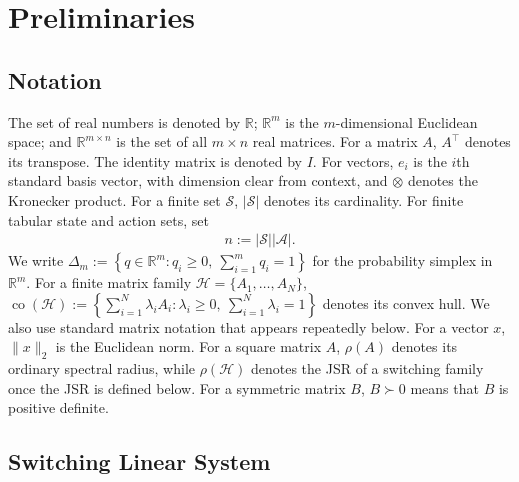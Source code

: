 \documentclass[letterpaper]{article}
\numberwithin{equation}{section}
\newcommand{\R}{\mathbb{R}}
\newcommand{\co}{\operatorname{co}}
\begin{document}
\section{Preliminaries}
\label{sec:preliminaries}
\subsection{Notation}
\label{sec:notation}

The set of real numbers is denoted by $\R$; $\R^m$ is the $m$-dimensional
Euclidean space; and $\R^{m\times n}$ is the set of all $m\times n$ real
matrices. For a matrix $A$, $A^\top$ denotes its transpose. The identity
matrix is denoted by $I$. For vectors, $e_i$ is the $i$th standard basis vector,
with dimension clear from context, and $\otimes$ denotes the Kronecker product.
For a finite set $\mathcal S$, $|\mathcal S|$ denotes its cardinality. For finite tabular state and action sets, set
\begin{align*}
  n:=|\mathcal S||\mathcal A|.
\end{align*}
We write $\Delta_m:=\left\{q\in\R^m:q_i\geq0,\ \sum_{i=1}^m q_i=1\right\}$ for the probability simplex in $\R^m$. For a finite matrix family
$\mathcal H=\{A_1,\ldots,A_N\}$, $\co(\mathcal H)
:=\left\{\sum_{i=1}^N\lambda_i A_i:
\lambda_i\geq0,\ \sum_{i=1}^N\lambda_i=1\right\}$ denotes its convex hull.
We also use standard matrix notation that appears repeatedly below. For a
vector $x$, $\|x\|_2$ is the Euclidean norm. For a square matrix $A$,
$\rho(A)$ denotes its ordinary spectral radius, while $\rho(\mathcal H)$ denotes
the JSR of a switching family once the JSR is defined below. For a symmetric
matrix $B$, $B\succ0$ means that $B$ is positive definite.

\subsection{Switching Linear System}
\label{sec:switching_systems}
\end{document}
